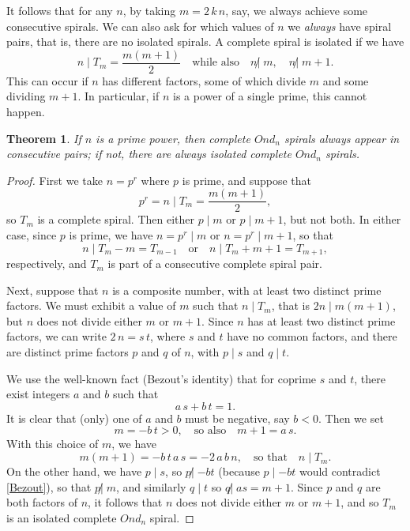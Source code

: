 \documentclass{article}
\newtheorem{theorem}{Theorem}
\theoremstyle{definition}
\def\com#1{\quad\text{{#1}}\quad}
\def\ndiv{{\not|\;}}
\begin{document}
It follows that for any $n$, by taking $m=2\,k\,n$, say, we always
achieve some consecutive spirals.  We can also ask for which values of
$n$ we \emph{always} have spiral pairs, that is, there are no isolated
spirals.  A complete spiral is isolated if we have
\[
  n \mid T_m=\frac{m(m+1)}2 \com{while also}
  n \ndiv m, \quad  n \ndiv m+1.
\]
This can occur if $n$ has different factors, some of which divide $m$
and some dividing $m+1$.  In particular, if $n$ is a power of a single
prime, this cannot happen.

\begin{theorem}
\label{thm:tri}
If $n$ is a prime power, then complete $Ond_n$ spirals
always appear in consecutive pairs; if not, there are always isolated
complete $Ond_n$ spirals.
\end{theorem}

\begin{proof}
First we take $n=p^r$ where $p$ is prime, and suppose that
\[
  p^r = n\mid T_m=\frac{m(m+1)}2,
\]
so $T_m$ is a complete spiral.  Then either $p\mid m$ or $p\mid m+1$, but not
both.  In either case, since $p$ is prime, we have $n=p^r\mid m$ or
$n=p^r\mid m+1$, so that
\[
  n\mid T_m - m = T_{m-1}  \com{or}
  n\mid T_m + m+1 = T_{m+1},
\]
respectively, and $T_m$ is part of a consecutive complete spiral pair.

Next, suppose that $n$ is a composite number, with at least two
distinct prime factors.  We must exhibit a value of $m$ such that
$n\mid T_m$, that is $2n\mid m(m+1)$, but $n$ does not divide either $m$ or
$m+1$.  Since $n$ has at least two distinct prime factors, we can
write $2\,n = s\,t$, where $s$ and $t$ have no common factors, and
there are distinct prime factors $p$ and $q$ of $n$, with $p\mid s$ and
$q\mid t$.

We use the well-known fact (Bezout's identity) that for coprime $s$
and $t$, there exist integers $a$ and $b$ such that
\begin{equation}
  a\,s + b\,t = 1.
\label{Bezout}
\end{equation}
It is clear that (only) one of $a$ and $b$ must be negative, say
$b<0$.  Then we set
\[
  m = -b\,t>0, \com{so also}
  m+1 = a\,s.
\]
With this choice of $m$, we have
\[
  m(m+1) = -b\,t\,a\,s = -2\,a\,b\,n, \com{so that}
  n\mid T_m.
\]
On the other hand, we have $p\mid s$, so $p \ndiv {-bt}$ (because $p\mid {-bt}$
would contradict \eqref{Bezout}), so that $p \ndiv m$, and similarly
$q\mid t$ so $q \ndiv as=m+1$.  Since $p$ and $q$ are both factors of
$n$, it follows that $n$ does not divide either $m$ or $m+1$, and so
$T_m$ is an isolated complete $Ond_n$ spiral.
\end{proof}
\end{document}
